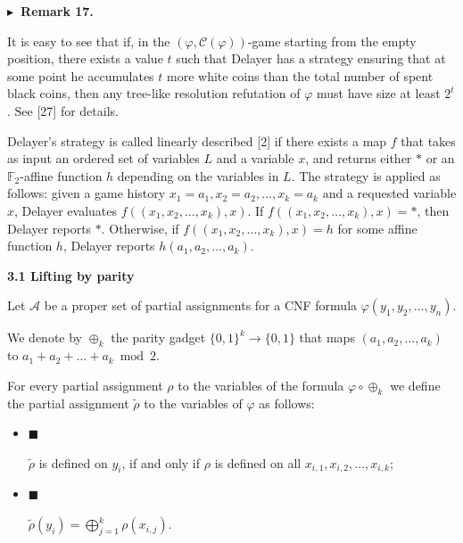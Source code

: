 \documentclass[10pt,a4paper]{article}
\begin{document}
\par\medskip\noindent\textbf{
$\blacktriangleright$ Remark 17.
}\par



It is easy to see that if, in the $(\varphi,\mathcal{C}(\varphi))$-game starting from
the empty position, there exists a value $t$ such that Delayer has a strategy ensuring
that at some point he accumulates $t$ more white coins than the total number of spent
black coins, then any tree-like resolution refutation of $\varphi$ must have
size at least $2^{t}$. See [27] for details.\par




Delayer’s strategy is called linearly described [2] if there exists a map $f$
that takes as input an ordered set of variables $L$ and a variable $x$, and returns either
$*$ or an $\mathbb{F}_{2}$-affine function $h$ depending on the variables in $L$.
The strategy is applied as follows: given a game history $x_{1}=a_{1},x_{2}=a_{2},\dots,x_{k}=a_{k}$
and a requested variable $x$, Delayer evaluates $f((x_{1},x_{2},\dots,x_{k}),x)$.
If $f((x_{1},x_{2},\dots,x_{k}),x)=*$, then Delayer reports $*$.
Otherwise, if $f((x_{1},x_{2},\dots,x_{k}),x)=h$ for some affine function $h$, Delayer reports
$h(a_{1},a_{2},\dots,a_{k})$.\par


\par\medskip\noindent\textbf{
3.1 Lifting by parity}\par


Let $\mathcal{A}$ be a proper set of partial assignments for a CNF formula
$\varphi(y_{1},y_{2},\dots,y_{n})$.\par



We denote by $\oplus_{k}$ the parity gadget $\{0,1\}^{k}\to\{0,1\}$ that maps
$(a_{1},a_{2},\dots,a_{k})$ to $a_{1}+a_{2}+\dots+a_{k}\bmod 2$.\par



For every partial assignment $\rho$ to the variables of the formula $\varphi\circ\oplus_{k}$
we define the partial assignment $\tilde{\rho}$ to the variables of $\varphi$ as follows:\par


\begin{itemize}


\item 
$\blacksquare$ 


$\tilde{\rho}$ is defined on $y_{i}$, if and only if $\rho$ is defined on all
$x_{i,1},x_{i,2},\dots,x_{i,k}$;\par





\item 
$\blacksquare$ 


$\tilde{\rho}(y_{i})=\bigoplus_{j=1}^{k}\rho(x_{i,j})$.\par





\end{itemize}
\end{document}
